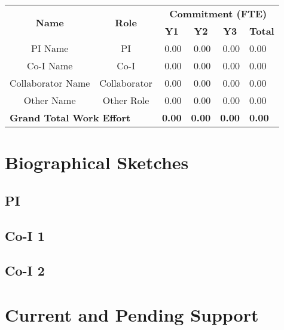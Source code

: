 \documentclass[oneside,12pt]{article}
\begin{document}
    \begin{table}[h]
        \centering
        \begin{tabular}{|c|c|r|r|r|l|}
            \hline
            \multirow{2}{*}{\textbf{Name}} & \multirow{2}{*}{\textbf{Role}} & \multicolumn{4}{c|}{\textbf{Commitment (FTE)}} \\
            \cline{3-6}
            & & \multicolumn{1}{c|}{\textbf{Y1}} & \multicolumn{1}{c|}{\textbf{Y2}} & \multicolumn{1}{c|}{\textbf{Y3}} & \multicolumn{1}{c|}{\textbf{Total}} \\
            \hline
            PI Name           & PI           & 0.00 & 0.00 & 0.00 & 0.00 \\
            Co-I Name         & Co-I         & 0.00 & 0.00 & 0.00 & 0.00 \\
            Collaborator Name & Collaborator & 0.00 & 0.00 & 0.00 & 0.00 \\
            Other Name        & Other Role   & 0.00 & 0.00 & 0.00 & 0.00 \\
            \hline
            \multicolumn{2}{|l|}{\textbf{Grand Total Work Effort}} & \textbf{0.00} & \textbf{0.00} & \textbf{0.00} & \textbf{0.00} \\
            \hline
        \end{tabular}
    \end{table}

    \clearpage


    \section{Biographical Sketches}

    \subsection{PI}

    \subsection{Co-I 1}

    \subsection{Co-I 2}


    \section{Current and Pending Support}
\end{document}
